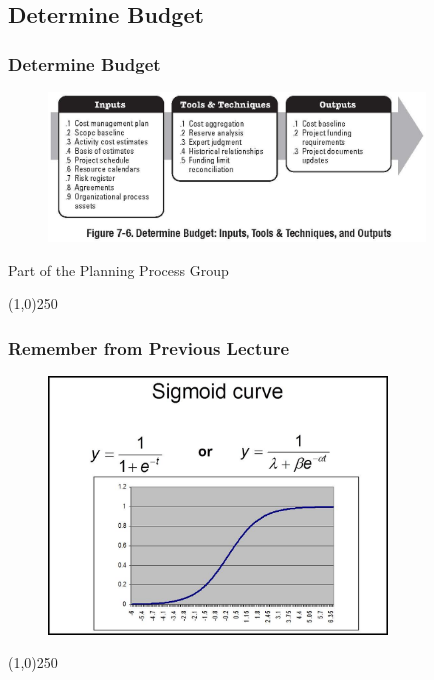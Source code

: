 \subsection{Determine Budget}


\begin{frame}
\frametitle{Determine Budget}
\begin{figure}
	\centering
		\includegraphics[width = 10cm]{images/Fig7-6.jpg}
	\label{fig:7-6c}
\end{figure}Part of the Planning Process Group
\end{frame}
\begin{center}\line(1,0){250}\end{center}






\begin{frame}
\frametitle{Remember from Previous Lecture}
\begin{figure}
	\centering
		\includegraphics[width = 9cm]{images/sigcurverecap.jpg}
	\label{fig:sigcurverecap}
\end{figure}
\end{frame}
\begin{center}\line(1,0){250}\end{center}






